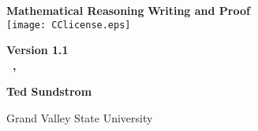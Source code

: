 \begin{titlepage}
\vspace*{0.5in}
\begin{center}
\fontsize{28.8}{12}\selectfont \textbf{Mathematical Reasoning}
\smallskip
\fontsize{23}{12}\selectfont \textbf{Writing and Proof}\\
\vspace{0.3125in}
\texttt{[image: CClicense.eps]}

\vspace{0.3in}
\textbf{\large{Version 1.1}} \\
\textbf{\large{\monthname~\the\day,~~\the\year}}

\vspace{1.0in}
\textbf{\huge{Ted Sundstrom}}



\smallskip
\Large{Grand Valley State University}
\end{center}


\end{titlepage}


\endinput
